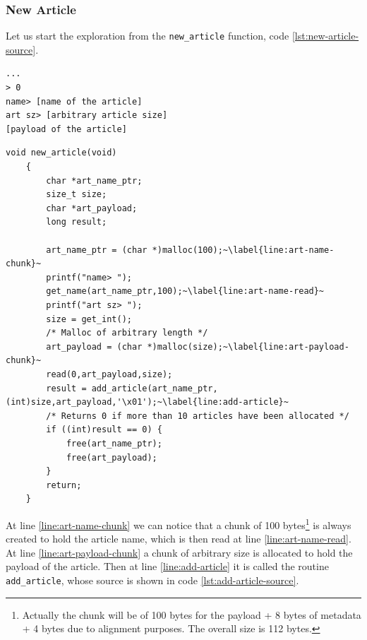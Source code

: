 \documentclass{article}
\numberwithin{equation}{subsection}
\begin{document}
\subsubsection{New Article}
Let us start the exploration from the \texttt{new\_article} function, code \ref{lst:new-article-source}.\newline
\noindent
\begin{minipage}{\textwidth}
\centering
\lstset{style=consolestyle}
\begin{lstlisting}[caption={New article menu of asciigal executable.},captionpos=b,label={lst:new-article-menu}]
...
> 0
name> [name of the article]
art sz> [arbitrary article size]
[payload of the article]
\end{lstlisting}
\end{minipage}
\begin{minipage}{\textwidth}
\centering
\lstset{style=cstyle}
\begin{lstlisting}[caption={New\_article routine of asciigal source code.},captionpos=b,label={lst:new-article-source}]
    void new_article(void)
	{
		char *art_name_ptr;
		size_t size;
		char *art_payload;
		long result;
		
		art_name_ptr = (char *)malloc(100);~\label{line:art-name-chunk}~
		printf("name> ");
		get_name(art_name_ptr,100);~\label{line:art-name-read}~
		printf("art sz> ");
		size = get_int();
		/* Malloc of arbitrary length */
		art_payload = (char *)malloc(size);~\label{line:art-payload-chunk}~
		read(0,art_payload,size);
		result = add_article(art_name_ptr,(int)size,art_payload,'\x01');~\label{line:add-article}~
		/* Returns 0 if more than 10 articles have been allocated */
		if ((int)result == 0) {
			free(art_name_ptr);
			free(art_payload);
		}
		return;
	}
\end{lstlisting}
\end{minipage}
At line \ref{line:art-name-chunk} we can notice that a chunk of 100 bytes\footnote{Actually the chunk will be of 100 bytes for the payload + 8 bytes of metadata + 4 bytes due to alignment purposes. The overall size is 112 bytes.} is always created to hold the article name, which is then read at line \ref{line:art-name-read}. At line \ref{line:art-payload-chunk} a chunk of arbitrary size is allocated to hold the payload of the article. Then at line \ref{line:add-article} it is called the routine \texttt{add\_article}, whose source is shown in code \ref{lst:add-article-source}.
\end{document}
